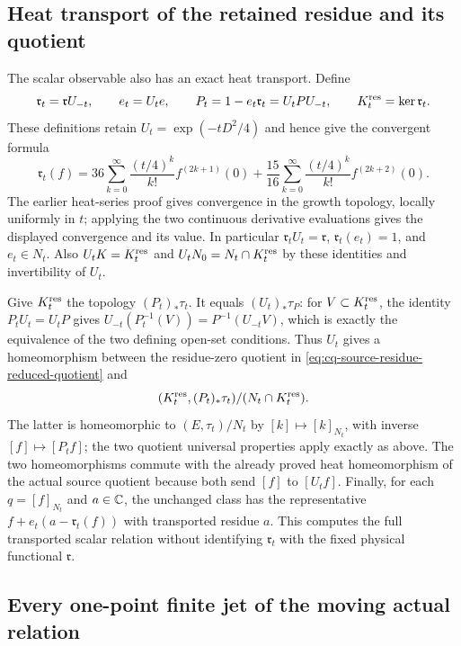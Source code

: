 \subsection{Heat transport of the retained residue and its quotient}
The scalar observable also has an exact heat transport. Define
\[
 \mathfrak r_t=\mathfrak r U_{-t},\qquad
 e_t=U_te,\qquad
 P_t=1-e_t\mathfrak r_t=U_tPU_{-t},\qquad
 K_t^{\rm res}=\ker\mathfrak r_t .
\]
These definitions retain $U_t=\exp(-tD^2/4)$ and hence
give the convergent formula
\begin{equation}
 \mathfrak r_t(f)
 =36\sum_{k=0}^{\infty}\frac{(t/4)^k}{k!}
       f^{(2k+1)}(0)
  +\frac{15}{16}\sum_{k=0}^{\infty}\frac{(t/4)^k}{k!}
       f^{(2k+2)}(0).
 \label{eq:cq-transported-spatial-residue}
\end{equation}
The earlier heat-series proof gives convergence in the growth
topology, locally uniformly in $t$; applying the two continuous
derivative evaluations gives the displayed convergence and
its value. In particular
$\mathfrak r_tU_t=\mathfrak r$,
$\mathfrak r_t(e_t)=1$, and $e_t\in N_t$.
Also $U_tK=K_t^{\rm res}$ and
$U_tN_0=N_t\cap K_t^{\rm res}$ by these identities and
invertibility of $U_t$.

Give $K_t^{\rm res}$ the topology $(P_t)_*\tau_t$.
It equals $(U_t)_*\tau_P$: for $V\subset K_t^{\rm res}$,
the identity $P_tU_t=U_tP$ gives
$U_{-t}(P_t^{-1}(V))=P^{-1}(U_{-t}V)$,
which is exactly the equivalence of the two defining open-set
conditions. Thus $U_t$ gives a homeomorphism between the
residue-zero quotient in
\eqref{eq:cq-source-residue-reduced-quotient} and
\[
 (K_t^{\rm res},(P_t)_*\tau_t)/
       (N_t\cap K_t^{\rm res}) .
\]
The latter is homeomorphic to $(E,\tau_t)/N_t$ by
$[k]\mapsto[k]_{N_t}$, with inverse $[f]\mapsto[P_tf]$;
the two quotient universal properties apply exactly as above.
The two homeomorphisms commute with the already proved heat
homeomorphism of the actual source quotient because both send
$[f]$ to $[U_tf]$. Finally, for each $q=[f]_{N_t}$ and
$a\in\mathbb C$, the unchanged class has the representative
$f+e_t(a-\mathfrak r_t(f))$ with transported residue $a$.
This computes the full transported scalar relation without
identifying $\mathfrak r_t$ with the fixed physical functional
$\mathfrak r$.

\subsection{Every one-point finite jet of the moving actual relation}
\label{sec:cq-moving-finite-jets}

